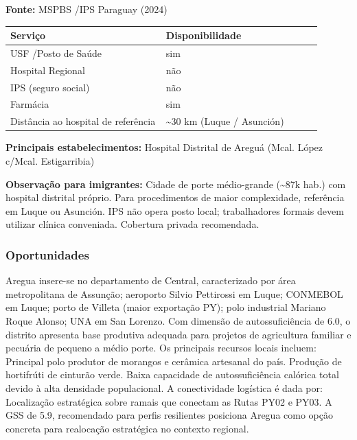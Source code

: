 \textbf{Fonte:} MSPBS /\allowbreak  IPS Paraguay (2024)

{\def\LTcaptype{none} %
\begin{longtable}{@{}>{\raggedright\arraybackslash}p{0.45\linewidth} >{\raggedright\arraybackslash}p{0.45\linewidth}@{}}
\toprule\noalign{}
Serviço & Disponibilidade \\
\midrule\noalign{}
\endhead
\bottomrule\noalign{}
\endlastfoot
USF /\allowbreak  Posto de Saúde & sim \\
Hospital Regional & não \\
IPS (seguro social) & não \\
Farmácia & sim \\
Distância ao hospital de referência & \textasciitilde30 km (Luque /\allowbreak 
Asunción) \\
\end{longtable}
}

\textbf{Principais estabelecimentos:} Hospital Distrital de Areguá
(Mcal. López c/\allowbreak  Mcal. Estigarribia)

\textbf{Observação para imigrantes:} Cidade de porte médio-grande
(\textasciitilde87k hab.) com hospital distrital próprio. Para
procedimentos de maior complexidade, referência em Luque ou Asunción.
IPS não opera posto local; trabalhadores formais devem utilizar clínica
conveniada. Cobertura privada recomendada.
\newpage

\subsubsection*{Oportunidades}\label{oport-aregua-1101}
Aregua insere-se no departamento de Central, caracterizado por área metropolitana de Assunção; aeroporto Silvio Pettirossi em Luque; CONMEBOL em Luque; porto de Villeta (maior exportação PY); polo industrial Mariano Roque Alonso; UNA em San Lorenzo. Com dimensão de autossuficiência de 6.0, o distrito apresenta base produtiva adequada para projetos de agricultura familiar e pecuária de pequeno a médio porte. Os principais recursos locais incluem: Principal polo produtor de morangos e cerâmica artesanal do país. Produção de hortifrúti de cinturão verde. Baixa capacidade de autossuficiência calórica total devido à alta densidade populacional. A conectividade logística é dada por: Localização estratégica sobre ramais que conectam as Rutas PY02 e PY03. A GSS de 5.9, recomendado para perfis resilientes posiciona Aregua como opção concreta para realocação estratégica no contexto regional.

